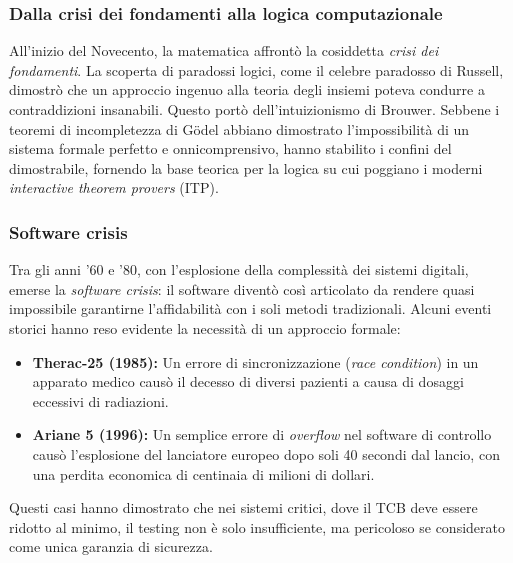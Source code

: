 \subsubsection{Dalla crisi dei fondamenti alla logica computazionale}
All'inizio del Novecento, la matematica affrontò la cosiddetta \emph{crisi dei fondamenti}. La scoperta di paradossi logici, come il celebre paradosso di Russell, 
dimostrò che un approccio ingenuo alla teoria degli insiemi poteva condurre a contraddizioni insanabili. Questo portò dell'intuizionismo di Brouwer. Sebbene i 
teoremi di incompletezza di Gödel abbiano dimostrato l'impossibilità di un sistema formale perfetto e onnicomprensivo, hanno stabilito i confini del dimostrabile, 
fornendo la base teorica per la logica su cui poggiano i moderni \emph{interactive theorem provers} (ITP).

\subsubsection{Software crisis}
Tra gli anni '60 e '80, con l'esplosione della complessità dei sistemi digitali, emerse la \emph{software crisis}: il software diventò così articolato da rendere quasi 
impossibile garantirne l'affidabilità con i soli metodi tradizionali. Alcuni eventi storici hanno reso evidente la necessità di un approccio formale:
\begin{itemize}
    \item \textbf{Therac-25 (1985):} Un errore di sincronizzazione (\emph{race condition}) in un apparato medico causò il decesso di diversi pazienti a causa di dosaggi eccessivi di radiazioni. 
    \item \textbf{Ariane 5 (1996):} Un semplice errore di \emph{overflow} nel software di controllo causò l'esplosione del lanciatore europeo dopo soli 40 secondi dal lancio, con una perdita economica di centinaia di milioni di dollari.
\end{itemize}
Questi casi hanno dimostrato che nei sistemi critici, dove il TCB deve essere ridotto al minimo, il testing non è solo insufficiente, ma pericoloso se considerato come unica garanzia di sicurezza.

